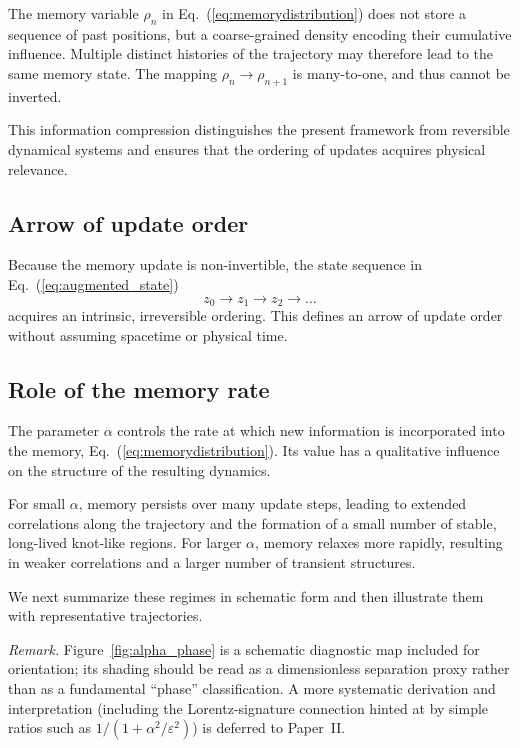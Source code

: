\documentclass[reprint,amsmath,amssymb,aps,prd,nofootinbib,floatfix]{revtex4-2}
\begin{document}
The memory variable $\rho_n$ in Eq.~(\ref{eq:memorydistribution}) does not store a sequence of past positions, but a coarse-grained density encoding their cumulative influence.
Multiple distinct histories of the trajectory may therefore lead to the same memory state.
The mapping $\rho_n\to\rho_{n+1}$ is many-to-one, and thus cannot be inverted.

This information compression distinguishes the present framework from reversible dynamical systems and ensures that the ordering of updates acquires physical relevance.

\subsection{Arrow of update order}

Because the memory update is non-invertible, the state sequence in Eq.~(\ref{eq:augmented_state})
\[
z_0 \rightarrow z_1 \rightarrow z_2 \rightarrow \dots
\]
acquires an intrinsic, irreversible ordering.
This defines an arrow of update order without assuming spacetime or physical time.

\subsection{Role of the memory rate}

The parameter $\alpha$ controls the rate at which new information is incorporated into the memory, Eq.~(\ref{eq:memorydistribution}).
Its value has a qualitative influence on the structure of the resulting dynamics. 

For small $\alpha$, memory persists over many update steps, leading to extended correlations along the trajectory and the formation of a small number of stable, long-lived knot-like regions.
For larger $\alpha$, memory relaxes more rapidly, resulting in weaker correlations and a
larger number of transient structures.

We next summarize these regimes in schematic form and then illustrate them with representative trajectories.
\par\noindent\emph{Remark.}
Figure~\ref{fig:alpha_phase} is a schematic diagnostic map included for orientation; its shading should be read as a dimensionless separation proxy rather than as a fundamental ``phase'' classification. A more systematic derivation and interpretation (including the Lorentz-signature connection hinted at by simple ratios such as $1/(1+\alpha^2/\varepsilon^2)$) is deferred to Paper~II.
\end{document}
